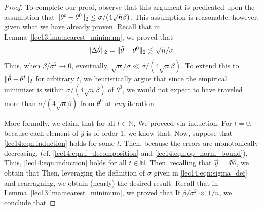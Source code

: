 \begin{proof}
To complete our proof, observe that this argument is predicated upon the assumption that $\|\theta^t - \theta^0\|_2 \leq \sigma/(4\sqrt{n}\beta)$. This assumption is reasonable, however, given what we have already proven. Recall that in Lemma~\ref{lec13:lma:nearest_minimum}, we proved that 
\begin{align}
    \|\Delta \hat{\theta}\|_2 = \|\hat{\theta} - \theta^{0}\|_2 \lesssim \sqrt{n}/\sigma.
\end{align}
Thus, when $\beta/\sigma^2 \rightarrow 0$, eventually, $\sqrt{n}/\sigma \ll \sigma/(4\sqrt{n}\beta)$. To extend this to $\|\hat{\theta} - \theta^t\|_2$ for arbitrary $t$, we heuristically argue that since the empirical minimizer is within $\sigma/(4\sqrt{n}\beta)$ of $\theta^0$, we would not expect to have traveled more than $\sigma/(4\sqrt{n}\beta)$ from $\theta^0$ at \emph{any} iteration. 

More formally, we claim that for all $t \in \mathbb{N}$, 
We proceed via induction. For $t=0$, because each element of $\hat{y}$ is of order $1$, we know that: 
Now, suppose that \eqref{lec14:eqn:induction} holds for some $t$. Then, because the errors are monotonically decreasing, (cf. \eqref{lec14:eqn:f_decomposition} and \eqref{lec14:eqn:op_norm_bound}), 
Thus, \eqref{lec14:eqn:induction} holds for all $t \in \mathbb{N}$. Then, recalling that $\vec{y} = \Phi\hat{\theta}$, we obtain that
Then, leveraging the definition of $\sigma$ given in \eqref{lec14:eqn:sigma_def} and rearragning, we obtain (nearly) the desired result:
Recall that in Lemma~\ref{lec13:lma:nearest_minimum}, we proved that 
If $\beta/\sigma^2 \ll 1/n$, we conclude that
\end{proof}

